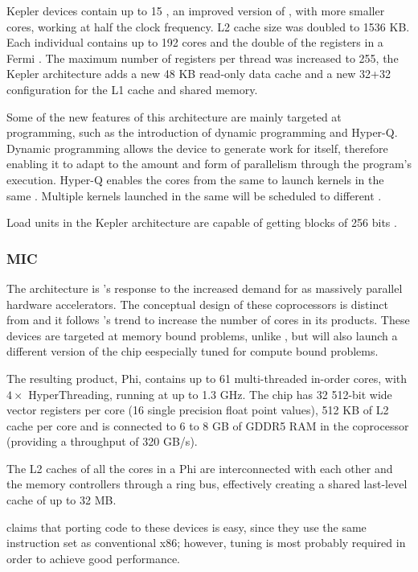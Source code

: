Kepler devices contain up to 15 \smx, an improved version of \sm, with more smaller cores, working at half the clock frequency. L2 cache size was doubled to 1536 KB. Each individual \smx contains up to 192 cores and the double of the registers in a Fermi \sm. The maximum number of registers per thread was increased to 255, the Kepler architecture adds a new 48 KB read-only data cache and a new 32+32 configuration for the L1 cache and shared memory.

Some of the new features of this architecture are mainly targeted at programming, such as the introduction of dynamic programming and Hyper-Q. Dynamic programming allows the device to generate work for itself, therefore enabling it to adapt to the amount and form of parallelism through the program's execution. Hyper-Q enables the cores from the same \cpu to launch kernels in the same \gpu. Multiple kernels launched in the same \gpu will be scheduled to different \smx.

Load units in the Kepler architecture are capable of getting blocks of 256 bits \cite{NVIDIA:KEPLER}.


\subsubsection{\acf{MIC}}
The \mic architecture \cite{Intel:XeonPhi:QuickStartGuide} is \intel's response to the increased demand for \gpgpus as massively parallel hardware accelerators. The conceptual design of these coprocessors is distinct from \gpgpus and it follows \intel's trend to increase the number of cores in its products. These devices are targeted at memory bound problems, unlike \gpus, but \intel will also launch a different version of the chip eespecially tuned for compute bound problems.

The resulting product, \intel\xeon Phi, contains up to 61 multi-threaded in-order cores, with $4\times$ HyperThreading, running at up to 1.3 GHz. The chip has 32 512-bit wide vector registers per core (16 single precision float point values), 512 KB of L2 cache per core and is connected to 6 to 8 GB of GDDR5 RAM in the coprocessor (providing a throughput of 320 GB/s).

The L2 caches of all the cores in a \xeon Phi are interconnected with each other and the memory controllers through a ring bus, effectively creating a shared last-level cache of up to 32 MB.

\intel claims that porting \cpu code to these devices is easy, since they use the same instruction set as conventional x86; however, tuning is most probably required in order to achieve good performance.




